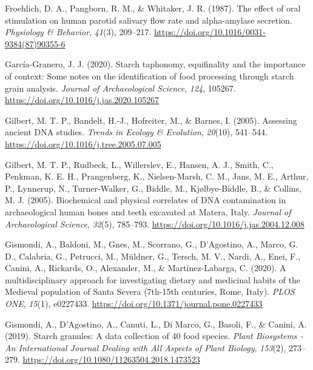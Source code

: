 \documentclass[
  letterpaper,
]{book}
\newlength{\cslhangindent}
\newlength{\cslentryspacingunit} %
\newenvironment{CSLReferences}[2] %
 {%
  \setlength{\parindent}{0pt}
  \ifodd #1
  \let\oldpar\par
  \def\par{\hangindent=\cslhangindent\oldpar}
  \fi
  \setlength{\parskip}{#2\cslentryspacingunit}
 }%
 {}
\begin{document}
\begin{CSLReferences}{1}{0}
\leavevmode{}%
Froehlich, D. A., Pangborn, R. M., \& Whitaker, J. R. (1987). The effect
of oral stimulation on human parotid salivary flow rate and
alpha-amylase secretion. \emph{Physiology \& Behavior}, \emph{41}(3),
209--217. \url{https://doi.org/10.1016/0031-9384(87)90355-6}

\leavevmode{}%
García-Granero, J. J. (2020). Starch taphonomy, equifinality and the
importance of context: {Some} notes on the identification of food
processing through starch grain analysis. \emph{Journal of
Archaeological Science}, \emph{124}, 105267.
\url{https://doi.org/10.1016/j.jas.2020.105267}

\leavevmode{}%
Gilbert, M. T. P., Bandelt, H.-J., Hofreiter, M., \& Barnes, I. (2005).
Assessing ancient {DNA} studies. \emph{Trends in Ecology \& Evolution},
\emph{20}(10), 541--544.
\url{https://doi.org/10.1016/j.tree.2005.07.005}

\leavevmode{}%
Gilbert, M. T. P., Rudbeck, L., Willerslev, E., Hansen, A. J., Smith,
C., Penkman, K. E. H., Prangenberg, K., Nielsen-Marsh, C. M., Jans, M.
E., Arthur, P., Lynnerup, N., Turner-Walker, G., Biddle, M.,
Kjølbye-Biddle, B., \& Collins, M. J. (2005). Biochemical and physical
correlates of {DNA} contamination in archaeological human bones and
teeth excavated at {Matera}, {Italy}. \emph{Journal of Archaeological
Science}, \emph{32}(5), 785--793.
\url{https://doi.org/10.1016/j.jas.2004.12.008}

\leavevmode{}%
Gismondi, A., Baldoni, M., Gnes, M., Scorrano, G., D'Agostino, A.,
Marco, G. D., Calabria, G., Petrucci, M., Müldner, G., Tersch, M. V.,
Nardi, A., Enei, F., Canini, A., Rickards, O., Alexander, M., \&
Martínez-Labarga, C. (2020). A multidisciplinary approach for
investigating dietary and medicinal habits of the {Medieval} population
of {Santa Severa} (7th-15th centuries, {Rome}, {Italy}). \emph{PLOS
ONE}, \emph{15}(1), e0227433.
\url{https://doi.org/10.1371/journal.pone.0227433}

\leavevmode{}%
Gismondi, A., D'Agostino, A., Canuti, L., Di Marco, G., Basoli, F., \&
Canini, A. (2019). Starch granules: A data collection of 40 food
species. \emph{Plant Biosystems - An International Journal Dealing with
All Aspects of Plant Biology}, \emph{153}(2), 273--279.
\url{https://doi.org/10.1080/11263504.2018.1473523}


\end{CSLReferences}
\end{document}
